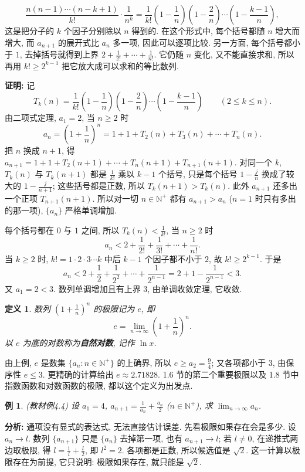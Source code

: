 \documentclass[UTF8,openany]{ctexbook}
\theoremstyle{chinesetextbook}
\newtheorem{definition}{定义}[section]
\newtheorem{example}{例}[section]
\newenvironment{cnproof}{\par\indent\textbf{证明:} \ignorespaces}{\par}
\begin{document}
\[
\frac{n(n-1)\cdots(n-k+1)}{k!}\cdot\frac1{n^k}=\frac1{k!}\left(1-\frac1n\right)\left(1-\frac2n\right)\cdots\left(1-\frac{k-1}n\right),
\]
这是把分子的 $k$ 个因子分别除以 $n$ 得到的. 在这个形式中, 每个括号都随 $n$ 增大而增大, 而 $a_{n+1}$ 的展开式比 $a_n$ 多一项, 因此可以逐项比较. 另一方面, 每个括号都小于 $1$, 去掉括号就得到上界 $\displaystyle2+\frac1{2!}+\cdots+\frac1{n!}$. 它仍随 $n$ 变化, 又不能直接求和, 所以再用 $k!\ge2^{k-1}$ 把它放大成可以求和的等比数列.
\begin{cnproof}
记
\[
T_k(n)=\frac1{k!}\left(1-\frac1n\right)\left(1-\frac2n\right)\cdots\left(1-\frac{k-1}n\right)\qquad(2\le k\le n).
\]
由二项式定理, $a_1=2$, 当 $n\ge2$ 时
\[
a_n=\left(1+\frac1n\right)^n=1+1+T_2(n)+T_3(n)+\cdots+T_n(n).
\]
把 $n$ 换成 $n+1$, 得 $a_{n+1}=1+1+T_2(n+1)+\cdots+T_n(n+1)+T_{n+1}(n+1)$. 对同一个 $k$, $T_k(n)$ 与 $T_k(n+1)$ 都是 $\displaystyle\frac1{k!}$ 乘以 $k-1$ 个括号, 只是每个括号 $\displaystyle1-\frac jn$ 换成了较大的 $\displaystyle1-\frac j{n+1}$; 这些括号都是正数, 所以 $T_k(n+1)>T_k(n)$. 此外 $a_{n+1}$ 还多出一个正项 $T_{n+1}(n+1)$. 所以对一切 $n\in\mathbb N^+$ 都有 $a_{n+1}>a_n$ ($n=1$ 时只有多出的那一项), $\{a_n\}$ 严格单调增加.

每个括号都在 $0$ 与 $1$ 之间, 所以 $\displaystyle T_k(n)<\frac1{k!}$, 当 $n\ge2$ 时
\[
a_n<2+\frac1{2!}+\frac1{3!}+\cdots+\frac1{n!}.
\]
当 $k\ge2$ 时, $k!=1\cdot2\cdot3\cdots k$ 中后 $k-1$ 个因子都不小于 $2$, 故 $k!\ge2^{k-1}$. 于是
\[
a_n<2+\frac12+\frac1{2^2}+\cdots+\frac1{2^{n-1}}=2+1-\frac1{2^{n-1}}<3.
\]
又 $a_1=2<3$. 数列单调增加且有上界 $3$, 由单调收敛定理, 它收敛.
\end{cnproof}
\begin{definition}
数列 $\displaystyle\left(1+\frac1n\right)^n$ 的极限记为 $e$, 即
\[
e=\lim_{n\to\infty}\left(1+\frac1n\right)^n.
\]
以 $e$ 为底的对数称为\textbf{自然对数}, 记作 $\ln x$.
\end{definition}
由上例, $e$ 是数集 $\{a_n:n\in\mathbb N^+\}$ 的上确界, 所以 $\displaystyle e\ge a_2=\frac94$; 又各项都小于 $3$, 由保序性 $e\le3$. 更精确的计算给出 $e\approx2.71828$. 1.6 节的第二个重要极限以及 1.8 节中指数函数和对数函数的极限, 都以这个定义为出发点.
\begin{example}
\textnormal{(教材例4.4)} 设 $a_1=4$, $\displaystyle a_{n+1}=\frac1{a_n}+\frac{a_n}2$ ($n\in\mathbb N^+$), 求 $\displaystyle\lim_{n\to\infty}a_n$.
\end{example}
\par\indent\textbf{分析:} 通项没有显式的表达式, 无法直接估计误差. 先看极限如果存在会是多少. 设 $a_n\to l$. 数列 $\{a_{n+1}\}$ 只是 $\{a_n\}$ 去掉第一项, 也有 $a_{n+1}\to l$; 若 $l\ne0$, 在递推式两边取极限, 得 $\displaystyle l=\frac1l+\frac l2$, 即 $l^2=2$. 各项都是正数, 所以候选值是 $\sqrt2$. 这一计算以极限存在为前提, 它只说明: 极限如果存在, 就只能是 $\sqrt2$.
\end{document}
